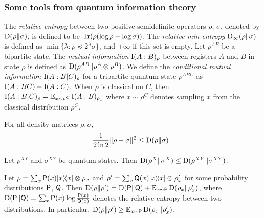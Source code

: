 \subsubsection{Some tools from quantum information theory}

The \emph{relative entropy} between two positive semidefinite operators $\rho$, $\sigma$, denoted by $\D(\rho \| \sigma)$, is defined to be $\Tr(\rho (\log \rho - \log \sigma))$. The \emph{relative min-entropy} $\D_\infty(\rho \| \sigma)$ is defined as $\min\{ \lambda : \rho \preceq 2^\lambda \sigma \}$, and $+\infty$ if this set is empty. Let $\rho^{AB}$ be a bipartite state. The \emph{mutual information} $\I(A:B)_\rho$ between registers $A$ and $B$ in state $\rho$ is defined as $\D(\rho^{AB} \| \rho^A \otimes \rho^B)$. We define the \emph{conditional mutual information} $\I(A:B|C)_\rho$ for a tripartite quantum state $\rho^{ABC}$ as $\I(A:BC) - \I(A:C)$. When $\rho$ is classical on $C$, then $\I(A:B|C)_\rho = \Ex_{x \sim \rho^C} \I(A:B)_{\rho_x}$ where $x \sim \rho^C$ denotes sampling $x$ from the classical distribution $\rho^C$.

\begin{proposition}
\label{prop:pinsker}
	For all density matrices $\rho, \sigma$, 
	\[
		 \frac{1}{2 \ln 2} \| \rho - \sigma \|^2_1 \leq \D(\rho \| \sigma)~.
	\]
\end{proposition}


\begin{proposition}
\label{prop:divergence_data_processing}
Let $\rho^{XY}$ and $\sigma^{XY}$ be quantum states. Then $\D(\rho^{X} \| \sigma^X) \leq \D(\rho^{XY} \| \sigma^{XY})$.
\end{proposition}

\begin{proposition}
\label{prop:divergence_chain_rule}
	Let $\rho = \sum_x \P(x) \ketbra{x}{x} \otimes \rho_x$ and $\rho' = \sum_x \Qsf(x) \ketbra{x}{x} \otimes \rho'_x$ for some probability distributions $\P$, $\Qsf$. Then $\D(\rho \| \rho') = \D(\P \| \Qsf) + \Ex_{x \sim \P} \D(\rho_x \| \rho_x') $, where $\D(\P \| \Qsf) = \sum_x \P(x) \log \frac{\P(x)}{\Qsf(x)}$ denotes the relative entropy between two distributions. In particular, $\D(\rho \| \rho') \geq \Ex_{x \sim \P} \D(\rho_x \| \rho_x')$.
\end{proposition}

